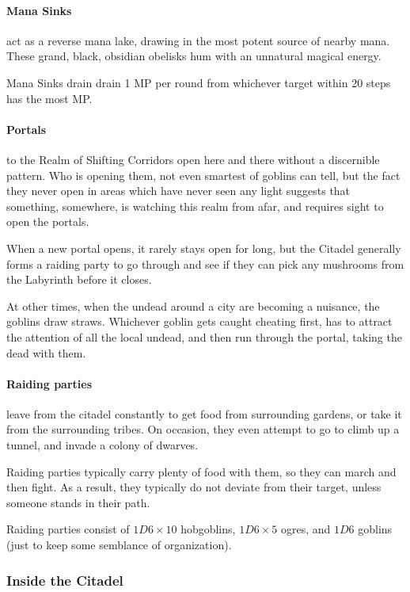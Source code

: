 \begin{multicols}{2}
\paragraph{Mana Sinks}
act as a reverse mana lake, drawing in the most potent source of nearby mana.
These grand, black, obsidian obelisks hum with an unnatural magical energy.

Mana Sinks drain drain 1 MP per round from whichever target within 20 steps has the most MP.

\paragraph{Portals}
to the Realm of Shifting Corridors open here and there without a discernible pattern.
Who is opening them, not even smartest of goblins can tell, but the fact they never open in areas which have never seen any light suggests that something, somewhere, is watching this realm from afar, and requires sight to open the portals.

When a new portal opens, it rarely stays open for long, but the Citadel generally forms a raiding party to go through and see if they can pick any mushrooms from the Labyrinth before it closes.

At other times, when the undead around a city are becoming a nuisance, the goblins draw straws.
Whichever goblin gets caught cheating first, has to attract the attention of all the local undead, and then run through the portal, taking the dead with them.

\paragraph{Raiding parties}
leave from the citadel constantly to get food from surrounding gardens, or take it from the surrounding tribes.
On occasion, they even attempt to go to climb up a tunnel, and invade a colony of dwarves.

Raiding parties typically carry plenty of food with them, so they can march and then fight.
As a result, they typically do not deviate from their target, unless someone stands in their path.

Raiding parties consist of $1D6 \times 10$ hobgoblins, $1D6 \times 5$ ogres, and $1D6$ goblins (just to keep some semblance of organization).


\subsubsection{Inside the Citadel}


\end{multicols}

